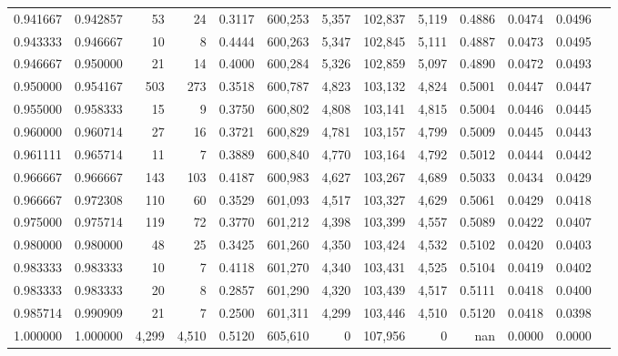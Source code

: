\begin{tabular}{rrrrrrrrrrrrr}
0.941667 & 0.942857 &     53 &     24 &                                     0.3117 & 600,253 &   5,357 & 102,837 &   5,119 & 0.4886 & 0.0474 & 0.0496 \\
0.943333 & 0.946667 &     10 &      8 &                                     0.4444 & 600,263 &   5,347 & 102,845 &   5,111 & 0.4887 & 0.0473 & 0.0495 \\
0.946667 & 0.950000 &     21 &     14 &                                     0.4000 & 600,284 &   5,326 & 102,859 &   5,097 & 0.4890 & 0.0472 & 0.0493 \\
0.950000 & 0.954167 &    503 &    273 &                                     0.3518 & 600,787 &   4,823 & 103,132 &   4,824 & 0.5001 & 0.0447 & 0.0447 \\
0.955000 & 0.958333 &     15 &      9 &                                     0.3750 & 600,802 &   4,808 & 103,141 &   4,815 & 0.5004 & 0.0446 & 0.0445 \\
0.960000 & 0.960714 &     27 &     16 &                                     0.3721 & 600,829 &   4,781 & 103,157 &   4,799 & 0.5009 & 0.0445 & 0.0443 \\
0.961111 & 0.965714 &     11 &      7 &                                     0.3889 & 600,840 &   4,770 & 103,164 &   4,792 & 0.5012 & 0.0444 & 0.0442 \\
0.966667 & 0.966667 &    143 &    103 &                                     0.4187 & 600,983 &   4,627 & 103,267 &   4,689 & 0.5033 & 0.0434 & 0.0429 \\
0.966667 & 0.972308 &    110 &     60 &                                     0.3529 & 601,093 &   4,517 & 103,327 &   4,629 & 0.5061 & 0.0429 & 0.0418 \\
0.975000 & 0.975714 &    119 &     72 &                                     0.3770 & 601,212 &   4,398 & 103,399 &   4,557 & 0.5089 & 0.0422 & 0.0407 \\
0.980000 & 0.980000 &     48 &     25 &                                     0.3425 & 601,260 &   4,350 & 103,424 &   4,532 & 0.5102 & 0.0420 & 0.0403 \\
0.983333 & 0.983333 &     10 &      7 &                                     0.4118 & 601,270 &   4,340 & 103,431 &   4,525 & 0.5104 & 0.0419 & 0.0402 \\
0.983333 & 0.983333 &     20 &      8 &                                     0.2857 & 601,290 &   4,320 & 103,439 &   4,517 & 0.5111 & 0.0418 & 0.0400 \\
0.985714 & 0.990909 &     21 &      7 &                                     0.2500 & 601,311 &   4,299 & 103,446 &   4,510 & 0.5120 & 0.0418 & 0.0398 \\
1.000000 & 1.000000 &  4,299 &  4,510 &                                     0.5120 & 605,610 &       0 & 107,956 &       0 &    nan & 0.0000 & 0.0000 \\
\bottomrule
\end{tabular}
